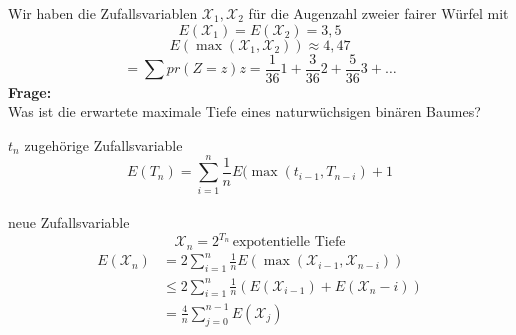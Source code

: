 Wir haben die Zufallsvariablen $\mathcal X_1,\mathcal X_2 $ für die Augenzahl zweier fairer Würfel mit 
\[E(\mathcal X_1)=E(\mathcal X_2)=3,5 \]
\[E(\max(\mathcal X_1,\mathcal X_2))\approx4,47 \]
\[=\sum pr(Z=z) z = \frac{1}{36}1+\frac{3}{36}2+\frac{5}{36}3+\hdots \]
\textbf{Frage:}\\
Was ist die erwartete maximale Tiefe eines naturwüchsigen binären Baumes?

$t_n$ zugehörige Zufallsvariable
\[E(T_n)=\sum_{i=1}^n \frac{1}{n}E(\max(t_{i-1},T_{n-i})+1\]
\\[.5em]
neue Zufallsvariable
\[\mathcal X_n=2^{T_n} \,\mbox{expotentielle Tiefe}\]
\begin{align*}
E(\mathcal X_n)&=2\sum_{i=1}^n\frac{1}{n}E(\max(\mathcal X_{i-1},\mathcal X_{n-i}))\\
&\le 2\sum_{i=1}^n\frac{1}{n}(E(\mathcal X_{i-1})+E(\mathcal X_n-i))\\
&=\frac{4}{n}\sum_{j=0}^{n-1}E(\mathcal X_j)
\end{align*}
\\[.5em]